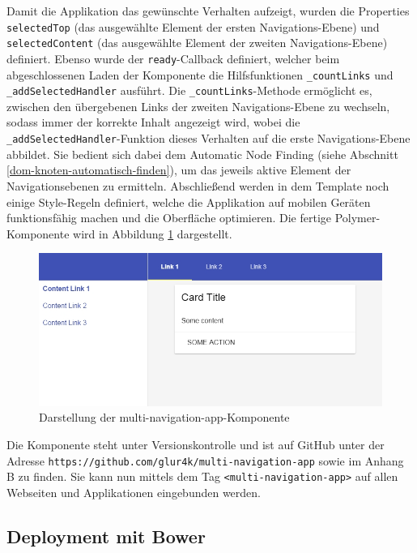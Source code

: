 Damit die Applikation das gewünschte Verhalten aufzeigt, wurden die Properties \texttt{selectedTop} (das ausgewählte Element der ersten Navigations-Ebene) und \texttt{selectedContent} (das ausgewählte Element der zweiten Navigations-Ebene) definiert. Ebenso wurde der \texttt{ready}-Callback definiert, welcher beim abgeschlossenen Laden der Komponente die Hilfsfunktionen \texttt{\_countLinks} und \texttt{\_addSelectedHandler} ausführt. Die \texttt{\_countLinks}-Methode ermöglicht es, zwischen den übergebenen Links der zweiten Navigations-Ebene zu wechseln, sodass immer der korrekte Inhalt angezeigt wird, wobei die \texttt{\_addSelectedHandler}-Funktion dieses Verhalten auf die erste Navigations-Ebene abbildet. Sie bedient sich dabei dem Automatic Node Finding (siehe Abschnitt \ref{dom-knoten-automatisch-finden}), um das jeweils \mbox{aktive} Element der Navigationsebenen zu ermitteln. Abschließend werden in dem Template noch einige Style-Regeln definiert, welche die Applikation auf mobilen Geräten funktionsfähig machen und die Oberfläche optimieren. Die fertige Polymer-Komponente wird in Abbildung \ref{fig:ddmnak} dargestellt.

\begin{figure}[htbp]
 \centering
 \includegraphics[width=12cm]{kapitel7/bilder/1-multi-navigation-app}
 \caption{Darstellung der multi-navigation-app-Komponente}
 \label{fig:ddmnak}
\end{figure}

Die Komponente steht unter Versionskontrolle und ist auf GitHub unter der Adresse \texttt{https://github.com/glur4k/multi-navigation-app} sowie im Anhang B zu finden. Sie kann nun mittels dem Tag \texttt{\textless{}multi-navigation-app\textgreater{}} auf allen Webseiten und Applikationen eingebunden werden.


\subsection{Deployment mit Bower}\label{deployment-mit-bower}

